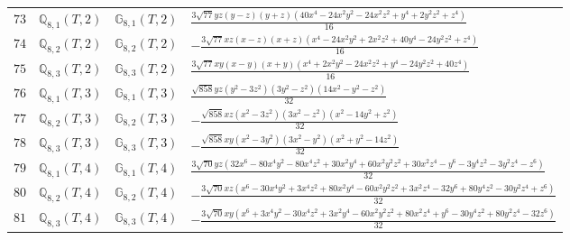 \documentclass[fleqn,8pt,landscape]{jsarticle}
\begin{document}
\begin{table}[ht!]
\begin{center}
\begin{tabular}{cccl}
$ 73 $ & $ \mathbb{Q}_{8,1}(T,2) $ & $ \mathbb{G}_{8,1}(T,2) $ & $ \frac{3 \sqrt{77} y z \left(y - z\right) \left(y + z\right) \left(40 x^{4} - 24 x^{2} y^{2} - 24 x^{2} z^{2} + y^{4} + 2 y^{2} z^{2} + z^{4}\right)}{16} $ \\
$ 74 $ & $ \mathbb{Q}_{8,2}(T,2) $ & $ \mathbb{G}_{8,2}(T,2) $ & $ - \frac{3 \sqrt{77} x z \left(x - z\right) \left(x + z\right) \left(x^{4} - 24 x^{2} y^{2} + 2 x^{2} z^{2} + 40 y^{4} - 24 y^{2} z^{2} + z^{4}\right)}{16} $ \\
$ 75 $ & $ \mathbb{Q}_{8,3}(T,2) $ & $ \mathbb{G}_{8,3}(T,2) $ & $ \frac{3 \sqrt{77} x y \left(x - y\right) \left(x + y\right) \left(x^{4} + 2 x^{2} y^{2} - 24 x^{2} z^{2} + y^{4} - 24 y^{2} z^{2} + 40 z^{4}\right)}{16} $ \\
$ 76 $ & $ \mathbb{Q}_{8,1}(T,3) $ & $ \mathbb{G}_{8,1}(T,3) $ & $ \frac{\sqrt{858} y z \left(y^{2} - 3 z^{2}\right) \left(3 y^{2} - z^{2}\right) \left(14 x^{2} - y^{2} - z^{2}\right)}{32} $ \\
$ 77 $ & $ \mathbb{Q}_{8,2}(T,3) $ & $ \mathbb{G}_{8,2}(T,3) $ & $ - \frac{\sqrt{858} x z \left(x^{2} - 3 z^{2}\right) \left(3 x^{2} - z^{2}\right) \left(x^{2} - 14 y^{2} + z^{2}\right)}{32} $ \\
$ 78 $ & $ \mathbb{Q}_{8,3}(T,3) $ & $ \mathbb{G}_{8,3}(T,3) $ & $ - \frac{\sqrt{858} x y \left(x^{2} - 3 y^{2}\right) \left(3 x^{2} - y^{2}\right) \left(x^{2} + y^{2} - 14 z^{2}\right)}{32} $ \\
$ 79 $ & $ \mathbb{Q}_{8,1}(T,4) $ & $ \mathbb{G}_{8,1}(T,4) $ & $ \frac{3 \sqrt{70} y z \left(32 x^{6} - 80 x^{4} y^{2} - 80 x^{4} z^{2} + 30 x^{2} y^{4} + 60 x^{2} y^{2} z^{2} + 30 x^{2} z^{4} - y^{6} - 3 y^{4} z^{2} - 3 y^{2} z^{4} - z^{6}\right)}{32} $ \\
$ 80 $ & $ \mathbb{Q}_{8,2}(T,4) $ & $ \mathbb{G}_{8,2}(T,4) $ & $ - \frac{3 \sqrt{70} x z \left(x^{6} - 30 x^{4} y^{2} + 3 x^{4} z^{2} + 80 x^{2} y^{4} - 60 x^{2} y^{2} z^{2} + 3 x^{2} z^{4} - 32 y^{6} + 80 y^{4} z^{2} - 30 y^{2} z^{4} + z^{6}\right)}{32} $ \\
$ 81 $ & $ \mathbb{Q}_{8,3}(T,4) $ & $ \mathbb{G}_{8,3}(T,4) $ & $ - \frac{3 \sqrt{70} x y \left(x^{6} + 3 x^{4} y^{2} - 30 x^{4} z^{2} + 3 x^{2} y^{4} - 60 x^{2} y^{2} z^{2} + 80 x^{2} z^{4} + y^{6} - 30 y^{4} z^{2} + 80 y^{2} z^{4} - 32 z^{6}\right)}{32} $ \\
 \hline \hline
\end{tabular}
\end{center}
\end{table}
\end{document}
